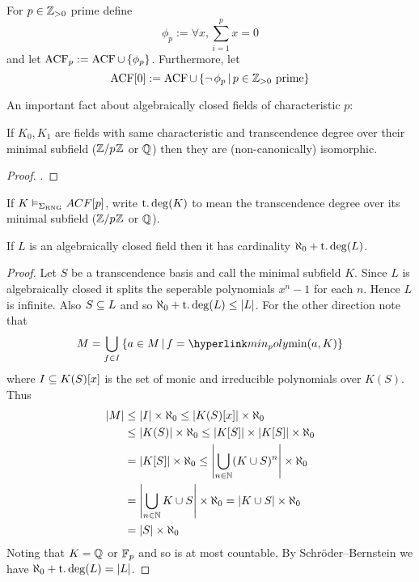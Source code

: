 \begin{dfn}
    For $p \in \mathbb{Z}_{>0}$ prime define 
    \[\phi_p := \forall x, \sum_{i = 1}^{p} x = 0\]
    and let $\operatorname{ACF}_p := \operatorname{ACF} \cup \left\{\phi_p\right\}$.
    Furthermore, let
    \[\operatorname{ACF}[0] := \operatorname{ACF} \cup \left\{\neg\, \phi_p \,|\, p \in \mathbb{Z}_{>0} \text{ prime}\right\}\]
\end{dfn}

An important fact about algebraically closed fields of characteristic $p$:
\begin{prop}
    If $K_0,K_1$ are fields with same characteristic and 
    transcendence degree over their minimal subfield ($\mathbb{Z}/p^{}\mathbb{Z}$ or $\mathbb{Q}$)
    then they are (non-canonically) isomorphic.
\end{prop}
\begin{proof}
    .
\end{proof}

\begin{nttn}
    If $K \vDash_{\Sigma_{\mathrm{RNG}}} ACF[p]$, write $\operatorname{t.deg}(K)$ to mean the 
    transcendence degree over its minimal subfield ($\mathbb{Z}/p^{}\mathbb{Z}$ or $\mathbb{Q}$).
\end{nttn}

\begin{lem}
    If $L$ is an algebraically closed field then it has cardinality
    $\aleph_0 + \operatorname{t.deg}(L)$.
\end{lem}
\begin{proof}
    Let $S$ be a transcendence basis and call the minimal subfield $K$.
    Since $L$ is algebraically closed it splits the seperable polynomials
    $x^n - 1$ for each $n$. 
    Hence $L$ is infinite.
    Also $S \subseteq L$ and so $\aleph_0 + \operatorname{t.deg}(L) \leq \left\vert L \right\vert$.
    For the other direction note that
    \[M = \bigcup_{f \in I}\set{a \in M \st f = \linkto{min_poly}{\min(a,K)}}\]
    where $I \subseteq K(S)[x]$ 
    is the set of monic and irreducible polynomials over $K(S)$.
    Thus 
    \begin{align*}
        \left\vert M \right\vert &\leq \left\vert I \right\vert \times \aleph_0 
        \leq \left\vert K(S)[x] \right\vert \times \aleph_0\\
        &\leq \left\vert K(S) \right\vert \times \aleph_0 
        \leq \left\vert K[S] \right\vert\times \left\vert K[S] \right\vert \times \aleph_0\\
        &= \left\vert K[S] \right\vert \times \aleph_0 
        \leq \left\vert \bigcup_{n \in \mathbb{N}} (K\cup S)^n \right\vert \times \aleph_0\\
        &= \left\vert \bigcup_{n \in \mathbb{N}} K \cup S \right\vert \times \aleph_0
        = \left\vert K \cup S \right\vert \times \aleph_0\\
        &= \left\vert S \right\vert \times \aleph_0
    \end{align*}
    Noting that $K = \mathbb{Q}$ or $\mathbb{F}_p$ and so is at most countable.
    By Schröder–Bernstein we have $\aleph_0 + \operatorname{t.deg}(L) = \left\vert L \right\vert$.
\end{proof}

